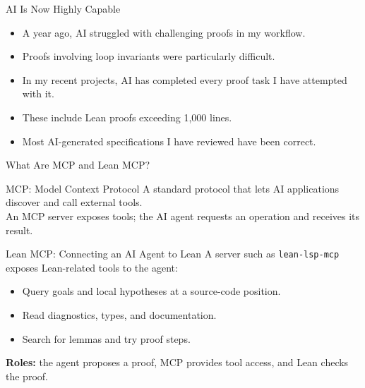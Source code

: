 \documentclass[aspectratio=169,xcolor=dvipsnames]{beamer}
\begin{document}
\begin{frame}{AI Is Now Highly Capable}
    \begin{itemize}
        \item A year ago, AI struggled with challenging proofs in my workflow.
        \item Proofs involving loop invariants were particularly difficult.
        \item In my recent projects, AI has completed every proof task I have attempted with it.
        \item These include Lean proofs exceeding 1,000 lines.
        \item Most AI-generated specifications I have reviewed have been correct.
    \end{itemize}
\end{frame}

\begin{frame}{What Are MCP and Lean MCP?}
    \small
    \begin{block}{MCP: Model Context Protocol}
        A standard protocol that lets AI applications discover and call external tools.\\[3pt]
        An MCP server exposes tools; the AI agent requests an operation and receives its result.
    \end{block}
    \begin{block}{Lean MCP: Connecting an AI Agent to Lean}
        A server such as \texttt{lean-lsp-mcp} exposes Lean-related tools to the agent:
        \begin{itemize}
            \item Query goals and local hypotheses at a source-code position.
            \item Read diagnostics, types, and documentation.
            \item Search for lemmas and try proof steps.
        \end{itemize}
    \end{block}
    \begin{center}
    \end{center}
    \footnotesize
    \textbf{Roles:} the agent proposes a proof, MCP provides tool access,
    and Lean checks the proof.
\end{frame}
\end{document}
